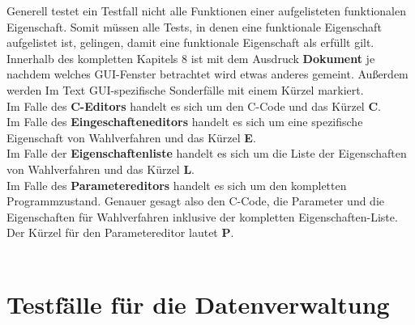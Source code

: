 \documentclass[a4paper]{scrreprt}
\begin{document}
Generell testet ein Testfall nicht alle Funktionen einer aufgelisteten funktionalen Eigenschaft. Somit müssen alle Tests, in denen eine funktionale Eigenschaft aufgelistet ist, gelingen, damit eine funktionale Eigenschaft als erfüllt gilt. \\
Innerhalb des kompletten Kapitels 8 ist mit dem Ausdruck \textbf{Dokument} je nachdem welches GUI-Fenster betrachtet wird etwas anderes gemeint. Außerdem werden Im Text GUI-spezifische Sonderfälle mit einem Kürzel markiert. \\
Im Falle des \textbf{C-Editors} handelt es sich um den C-Code und das Kürzel \textbf{C}. \\
Im Falle des \textbf{Eingeschafteneditors} handelt es sich um eine spezifische Eigenschaft von Wahlverfahren und das Kürzel \textbf{E}. \\
Im Falle der \textbf{Eigenschaftenliste} handelt es sich um die Liste der Eigenschaften von Wahlverfahren und das Kürzel \textbf{L}. \\
Im Falle des \textbf{Parametereditors} handelt es sich um den kompletten Programmzustand. Genauer gesagt also den C-Code, die Parameter und die Eigenschaften für Wahlverfahren inklusive der kompletten Eigenschaften-Liste. Der Kürzel für den Parametereditor lautet \textbf{P}. \\ \\

\section{Testfälle für die Datenverwaltung}
\end{document}
